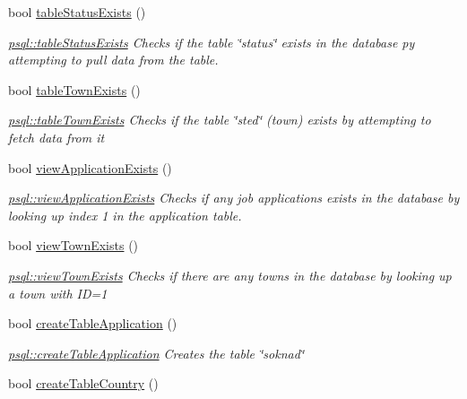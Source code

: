 \begin{DoxyCompactItemize}
bool \mbox{\hyperlink{classpsql_a3f8bac89bd0cee3af77e47e5c555543d}{table\+Status\+Exists}} ()
\begin{DoxyCompactList}\small\item\em \mbox{\hyperlink{classpsql_a3f8bac89bd0cee3af77e47e5c555543d}{psql\+::table\+Status\+Exists}} Checks if the table \char`\"{}status\char`\"{} exists in the database py attempting to pull data from the table. \end{DoxyCompactList}\item 
bool \mbox{\hyperlink{classpsql_a717162b7d7faa0fb41b5a526e42de4ac}{table\+Town\+Exists}} ()
\begin{DoxyCompactList}\small\item\em \mbox{\hyperlink{classpsql_a717162b7d7faa0fb41b5a526e42de4ac}{psql\+::table\+Town\+Exists}} Checks if the table \char`\"{}sted\char`\"{} (town) exists by attempting to fetch data from it \end{DoxyCompactList}\item 
bool \mbox{\hyperlink{classpsql_a4c23d467c41e155a55c38b1cefb9b54b}{view\+Application\+Exists}} ()
\begin{DoxyCompactList}\small\item\em \mbox{\hyperlink{classpsql_a4c23d467c41e155a55c38b1cefb9b54b}{psql\+::view\+Application\+Exists}} Checks if any job applications exists in the database by looking up index 1 in the application table. \end{DoxyCompactList}\item 
bool \mbox{\hyperlink{classpsql_aae95eb2a505c1b0b7b4d5671926ecd2f}{view\+Town\+Exists}} ()
\begin{DoxyCompactList}\small\item\em \mbox{\hyperlink{classpsql_aae95eb2a505c1b0b7b4d5671926ecd2f}{psql\+::view\+Town\+Exists}} Checks if there are any towns in the database by looking up a town with ID=1 \end{DoxyCompactList}\item 
bool \mbox{\hyperlink{classpsql_a36f6a197a2214b9c71cfcd620334835d}{create\+Table\+Application}} ()
\begin{DoxyCompactList}\small\item\em \mbox{\hyperlink{classpsql_a36f6a197a2214b9c71cfcd620334835d}{psql\+::create\+Table\+Application}} Creates the table \char`\"{}soknad\char`\"{} \end{DoxyCompactList}\item 
bool \mbox{\hyperlink{classpsql_ab6e496d8471f3cd9c5c082a6ba75c25b}{create\+Table\+Country}} ()

\end{DoxyCompactItemize}
